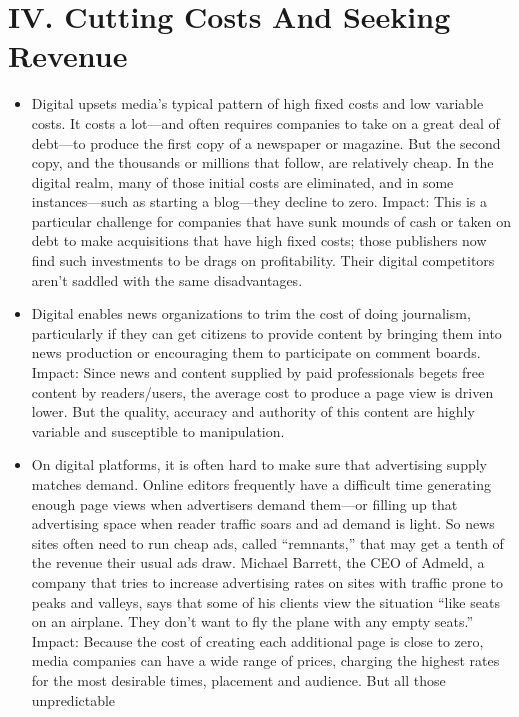 \section{IV. Cutting Costs And Seeking Revenue}
\begin{itemize}
\item Digital upsets media’s typical pattern of high fixed costs and low variable
costs. It costs a lot—and often requires companies to take on a great
deal of debt—to produce the first copy of a newspaper or magazine. But the
second copy, and the thousands or millions that follow, are relatively cheap.
In the digital realm, many of those initial costs are eliminated, and in some
instances—such as starting a blog—they decline to zero.
Impact: This is a particular challenge for companies that have sunk mounds
of cash or taken on debt to make acquisitions that have high fixed costs;
those publishers now find such investments to be drags on profitability. Their
digital competitors aren’t saddled with the same disadvantages.
\item Digital enables news organizations to trim the cost of doing journalism,
particularly if they can get citizens to provide content by bringing them into
news production or encouraging them to participate on comment boards.
Impact: Since news and content supplied by paid professionals begets free
content by readers/users, the average cost to produce a page view is driven
lower. But the quality, accuracy and authority of this content are highly variable
and susceptible to manipulation.
\item On digital platforms, it is often hard to make sure that advertising supply
matches demand. Online editors frequently have a difficult time generating
enough page views when advertisers demand them—or filling up that
advertising space when reader traffic soars and ad demand is light. So news
sites often need to run cheap ads, called ``remnants,'' that may get a tenth of
the revenue their usual ads draw. Michael Barrett, the CEO of Admeld, a
company that tries to increase advertising rates on sites with traffic prone to
peaks and valleys, says that some of his clients view the situation ``like seats
on an airplane. They don’t want to fly the plane with any empty seats.''
Impact: Because the cost of creating each additional page is close to zero,
media companies can have a wide range of prices, charging the highest rates
for the most desirable times, placement and audience. But all those unpredictable

\end{itemize}
